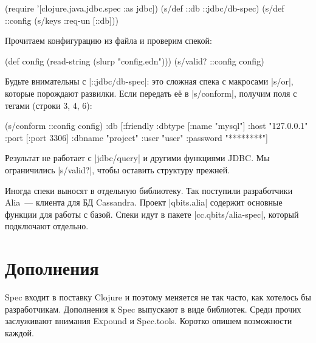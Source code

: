 \begin{english}
  \begin{clojure}
(require '[clojure.java.jdbc.spec :as jdbc])
(s/def ::db ::jdbc/db-spec)
(s/def ::config (s/keys :req-un [::db]))
  \end{clojure}
\end{english}

\noindent
Прочитаем конфигурацию из файла и проверим спекой:

\begin{english}
  \begin{clojure}
(def config (read-string (slurp "config.edn")))
(s/valid? ::config config)
  \end{clojure}
\end{english}

\label{jdbc-conform-warning}


Будьте внимательны с \spverb|::jdbc/db-spec|: это сложная спека с макросами
\spverb|s/or|, которые порождают развилки. Если передать е\"{е} в
\spverb|s/conform|, получим поля с тегами (строки 3, 4, 6):

\begin{english}
  \begin{clojure/lines}
(s/conform ::config config)
{:db
 [:friendly
  {:dbtype   [:name "mysql"]
   :host     "127.0.0.1"
   :port     [:port 3306]
   :dbname   "project"
   :user     "user"
   :password "********"}]}
  \end{clojure/lines}
\end{english}

Результат не работает с \spverb|jdbc/query| и другими функциями JDBC. Мы
ограничились \spverb|s/valid?|, чтобы оставить структуру прежней.


Иногда спеки выносят в отдельную библиотеку. Так поступили разработчики
Alia~--- клиента для БД
Cassandra. Проект \spverb|qbits.alia| содержит основные функции для работы с
базой. Спеки идут в пакете \spverb|cc.qbits/alia-spec|, который подключают
отдельно.

\section{Дополнения}

Spec входит в поставку Clojure и поэтому меняется не так часто, как хотелось бы
разработчикам. Дополнения к Spec выпускают в виде библиотек. Среди прочих
заслуживают внимания Expound и Spec.tools. Коротко опишем возможности каждой.

